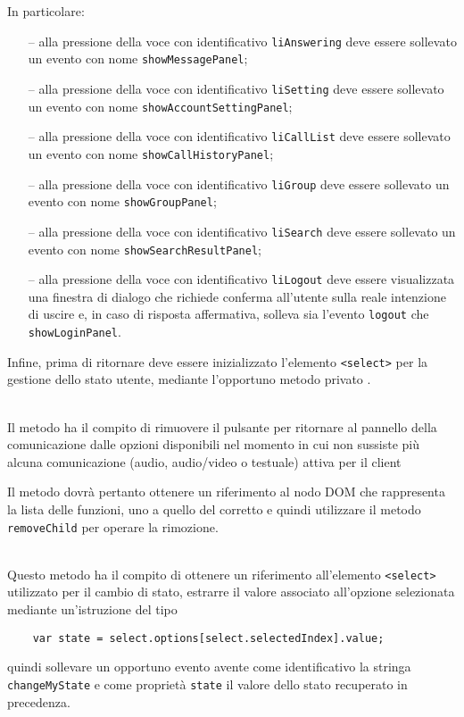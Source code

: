 \begin{description}
  In particolare:
  \begin{itemize}
    \item[--] alla pressione della voce con identificativo \verb'liAnswering' deve essere sollevato un evento con nome \verb'showMessagePanel';
    \item[--] alla pressione della voce con identificativo \verb'liSetting' deve essere sollevato un evento con nome \verb'showAccountSettingPanel';
    \item[--] alla pressione della voce con identificativo \verb'liCallList' deve essere sollevato un evento con nome \verb'showCallHistoryPanel';
    \item[--] alla pressione della voce con identificativo \verb'liGroup' deve essere sollevato un evento con nome \verb'showGroupPanel';
    \item[--] alla pressione della voce con identificativo \verb'liSearch' deve essere sollevato un evento con nome \verb'showSearchResultPanel';
    \item[--] alla pressione della voce con identificativo \verb'liLogout' deve essere visualizzata una finestra di dialogo che richiede conferma all'utente sulla reale intenzione di uscire e, in caso di risposta affermativa, solleva sia l'evento \verb'logout' che \verb'showLoginPanel'.
  \end{itemize}
  
  Infine, prima di ritornare deve essere inizializzato l'elemento \verb'<select>' per la gestione dello stato utente, mediante l'opportuno metodo privato .
  
  \item{}\\
  Il metodo ha il compito di rimuovere il pulsante per ritornare al pannello della comunicazione dalle opzioni disponibili nel momento in cui non sussiste più alcuna comunicazione (audio, audio/video o testuale) attiva per il client
  
   Il metodo dovrà pertanto ottenere un riferimento al nodo DOM che rappresenta la lista delle funzioni, uno a quello del  corretto e quindi utilizzare il metodo \verb'removeChild' per operare la rimozione.
  
  \item{}\\
  Questo metodo ha il compito di ottenere un riferimento all'elemento \verb'<select>' utilizzato per il cambio di stato, estrarre il valore associato all'opzione selezionata mediante un'istruzione del tipo
  \begin{verbatim}
    var state = select.options[select.selectedIndex].value;
  \end{verbatim}
  quindi sollevare un opportuno evento avente come identificativo la stringa \verb'changeMyState' e come proprietà \verb'state' il valore dello stato recuperato in precedenza.
  

\end{description}
